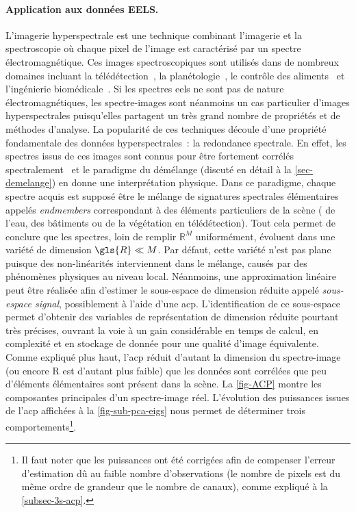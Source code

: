     \paragraph{Application aux données EELS.} L’imagerie hyperspectrale est une technique combinant l’imagerie et la spectroscopie où chaque pixel de l'image est caractérisé par un spectre électromagnétique. Ces images spectroscopiques sont utilisés dans de nombreux domaines incluant la télédétection~\cite{schaepman2009earth}, la planétologie~\cite{smith1985quantitative}, le contrôle des aliments~\cite{gowen2007hyperspectral} et l'ingénierie biomédicale~\cite{akbari2010detection}. Si les spectres \gls{eels} ne sont pas de nature électromagnétiques, les spectre-images sont néanmoins un cas particulier d'images hyperspectrales puisqu'elles partagent un très grand nombre de propriétés et de méthodes d'analyse.
    La popularité de ces techniques découle d'une propriété fondamentale des données hyperspectrales~: la redondance spectrale. En effet, les spectres issus de ces images sont connus pour être fortement corrélés spectralement~\cite{dobigeon2016linear, bioucas2012hyperspectral, dobigeon2012spectral} et le paradigme du démélange (discuté en détail à la \cref{sec-demelange}) en donne une interprétation physique. Dans ce paradigme, chaque spectre acquis est supposé être le mélange de signatures spectrales élémentaires appelés \emph{endmembers} correspondant à des éléments particuliers de la scène (\eg{} de l'eau, des bâtiments ou de la végétation en télédétection).
    Tout cela permet de conclure que les spectres, loin de remplir $\mathbb{R}^M$ uniformément, évoluent dans une variété de dimension $\gls{R}\ll M$. Par défaut, cette variété n'est pas plane puisque des non-linéarités interviennent dans le mélange, causés par des phénomènes physiques au niveau local. Néanmoins, une approximation linéaire peut être réalisée afin d'estimer le sous-espace de dimension réduite appelé \emph{sous-espace signal}, possiblement à l'aide d'une \gls{acp}. L'identification de ce sous-espace permet d'obtenir des variables de représentation de dimension réduite pourtant très précises, ouvrant la voie à un gain considérable en temps de calcul, en complexité et en stockage de donnée pour une qualité d'image équivalente. Comme expliqué plus haut, l'\gls{acp} réduit d'autant la dimension du spectre-image (ou encore \gls{R} est d'autant plus faible) que les données sont corrélées \ie{} que peu d'éléments élémentaires sont présent dans la scène. La \cref{fig-ACP} montre les composantes principales d'un spectre-image réel. L'évolution des puissances issues de l'\gls{acp} affichées à la \cref{fig-sub-pca-eigs} nous permet de déterminer trois comportements\footnote{Il faut noter que les puissances ont été corrigées afin de compenser l'erreur d'estimation dû au faible nombre d'observations (le nombre de pixels est du même ordre de grandeur que le nombre de canaux), comme expliqué à la \cref{subsec-3s-acp}.}.
